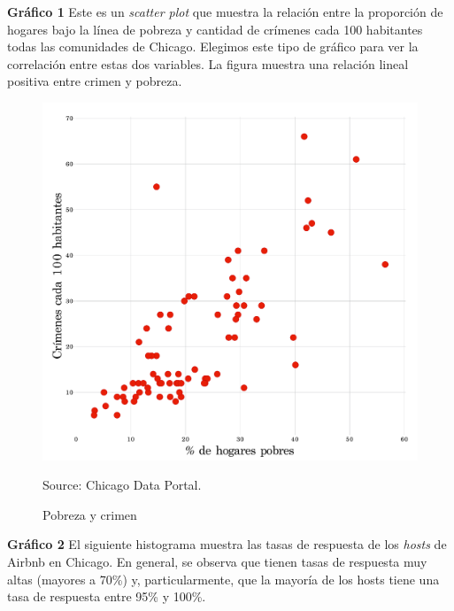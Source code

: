 \documentclass[11pt]{article}
\newcommand{\source}[1]{\caption*{Source: {#1}} }
\begin{document}
\newpage

\textbf{Gráfico 1} Este es un \textit{scatter plot} que muestra la relación entre la proporción de hogares bajo la línea de pobreza y cantidad de crímenes cada 100 habitantes todas las comunidades de Chicago. Elegimos este tipo de gráfico para ver la correlación entre estas dos variables. La figura muestra una relación lineal positiva entre crimen y pobreza.

\begin{figure}[H]
    \centering
    \caption{Pobreza y crimen}
    \includegraphics[scale=0.4]{grafico 1b airbnb.png}
    \source{Chicago Data Portal.}
    \label{fig:3}
\end{figure}

\textbf{Gráfico 2} El siguiente histograma muestra las tasas de respuesta de los \textit{hosts} de Airbnb en Chicago. En general, se observa que tienen tasas de respuesta muy altas (mayores a 70\%) y, particularmente, que la mayoría de los hosts tiene una tasa de respuesta entre 95\% y 100\%.
\end{document}
